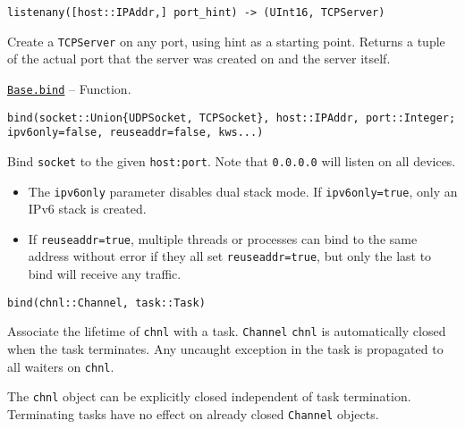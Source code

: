 \begin{adjustwidth}{2em}{0pt}


\begin{verbatim}
listenany([host::IPAddr,] port_hint) -> (UInt16, TCPServer)
\end{verbatim}

Create a \texttt{TCPServer} on any port, using hint as a starting point. Returns a tuple of the actual port that the server was created on and the server itself.



\end{adjustwidth}
\hypertarget{13811388816704022260}{} 
\hyperlink{13811388816704022260}{\texttt{Base.bind}}  -- {Function.}

\begin{adjustwidth}{2em}{0pt}


\begin{verbatim}
bind(socket::Union{UDPSocket, TCPSocket}, host::IPAddr, port::Integer; ipv6only=false, reuseaddr=false, kws...)
\end{verbatim}

Bind \texttt{socket} to the given \texttt{host:port}. Note that \texttt{0.0.0.0} will listen on all devices.

\begin{itemize}
\item The \texttt{ipv6only} parameter disables dual stack mode. If \texttt{ipv6only=true}, only an IPv6 stack is created.


\item If \texttt{reuseaddr=true}, multiple threads or processes can bind to the same address without error if they all set \texttt{reuseaddr=true}, but only the last to bind will receive any traffic.

\end{itemize}



\begin{verbatim}
bind(chnl::Channel, task::Task)
\end{verbatim}

Associate the lifetime of \texttt{chnl} with a task. \texttt{Channel} \texttt{chnl} is automatically closed when the task terminates. Any uncaught exception in the task is propagated to all waiters on \texttt{chnl}.

The \texttt{chnl} object can be explicitly closed independent of task termination. Terminating tasks have no effect on already closed \texttt{Channel} objects.


\end{adjustwidth}
